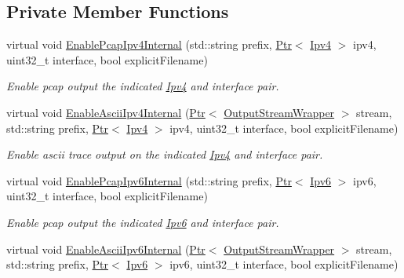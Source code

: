 \subsection*{Private Member Functions}
\begin{DoxyCompactItemize}
\item 
virtual void \hyperlink{classns3_1_1InternetStackHelper_aec9bacdd0e3902ad274270d914fdee23}{Enable\+Pcap\+Ipv4\+Internal} (std\+::string prefix, \hyperlink{classns3_1_1Ptr}{Ptr}$<$ \hyperlink{classns3_1_1Ipv4}{Ipv4} $>$ ipv4, uint32\+\_\+t interface, bool explicit\+Filename)
\begin{DoxyCompactList}\small\item\em Enable pcap output the indicated \hyperlink{classns3_1_1Ipv4}{Ipv4} and interface pair. \end{DoxyCompactList}\item 
virtual void \hyperlink{classns3_1_1InternetStackHelper_ab09a45882051edfc4881fc751ccbdd48}{Enable\+Ascii\+Ipv4\+Internal} (\hyperlink{classns3_1_1Ptr}{Ptr}$<$ \hyperlink{classns3_1_1OutputStreamWrapper}{Output\+Stream\+Wrapper} $>$ stream, std\+::string prefix, \hyperlink{classns3_1_1Ptr}{Ptr}$<$ \hyperlink{classns3_1_1Ipv4}{Ipv4} $>$ ipv4, uint32\+\_\+t interface, bool explicit\+Filename)
\begin{DoxyCompactList}\small\item\em Enable ascii trace output on the indicated \hyperlink{classns3_1_1Ipv4}{Ipv4} and interface pair. \end{DoxyCompactList}\item 
virtual void \hyperlink{classns3_1_1InternetStackHelper_a2ddebb75d6e8ce2c2b1b6fb55016ec00}{Enable\+Pcap\+Ipv6\+Internal} (std\+::string prefix, \hyperlink{classns3_1_1Ptr}{Ptr}$<$ \hyperlink{classns3_1_1Ipv6}{Ipv6} $>$ ipv6, uint32\+\_\+t interface, bool explicit\+Filename)
\begin{DoxyCompactList}\small\item\em Enable pcap output the indicated \hyperlink{classns3_1_1Ipv6}{Ipv6} and interface pair. \end{DoxyCompactList}\item 
virtual void \hyperlink{classns3_1_1InternetStackHelper_a812b901ab8c2aff1f7feca6a9864b9c2}{Enable\+Ascii\+Ipv6\+Internal} (\hyperlink{classns3_1_1Ptr}{Ptr}$<$ \hyperlink{classns3_1_1OutputStreamWrapper}{Output\+Stream\+Wrapper} $>$ stream, std\+::string prefix, \hyperlink{classns3_1_1Ptr}{Ptr}$<$ \hyperlink{classns3_1_1Ipv6}{Ipv6} $>$ ipv6, uint32\+\_\+t interface, bool explicit\+Filename)

\end{DoxyCompactItemize}
